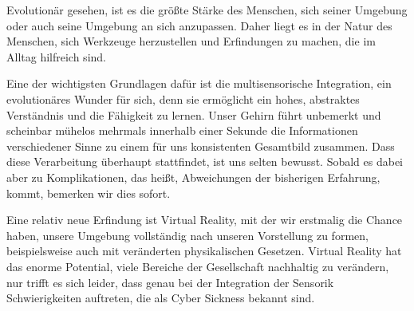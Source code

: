 Evolution\"ar gesehen, ist es die gr\"o{\ss}te St\"arke des Menschen, sich seiner Umgebung oder auch seine Umgebung an sich anzupassen. Daher liegt es in der Natur des Menschen, sich Werkzeuge herzustellen und Erfindungen zu machen, die im Alltag hilfreich sind.

Eine der wichtigsten Grundlagen daf\"ur ist die multisensorische Integration, ein evolution\"ares Wunder f\"ur sich, denn sie erm\"oglicht ein hohes, abstraktes Verst\"andnis und die F\"ahigkeit zu lernen. Unser Gehirn f\"uhrt unbemerkt und scheinbar m\"uhelos mehrmals innerhalb einer Sekunde die Informationen verschiedener Sinne zu einem f\"ur uns konsistenten Gesamtbild zusammen.
Dass diese Verarbeitung \"uberhaupt stattfindet, ist uns selten bewusst\cite{Deroy:2016:SensInte}. Sobald es dabei aber zu Komplikationen, das hei{\ss}t, Abweichungen der bisherigen Erfahrung, kommt, bemerken wir dies sofort. 

Eine relativ neue Erfindung ist Virtual Reality, mit der wir erstmalig die Chance haben, unsere Umgebung vollst\"andig nach unseren Vorstellung zu formen, beispielsweise auch mit ver\"anderten physikalischen Gesetzen.
Virtual Reality hat das enorme Potential, viele Bereiche der Gesellschaft nachhaltig zu ver\"andern, nur trifft es sich leider, dass genau bei der Integration der Sensorik Schwierigkeiten auftreten, die als Cyber Sickness bekannt sind.